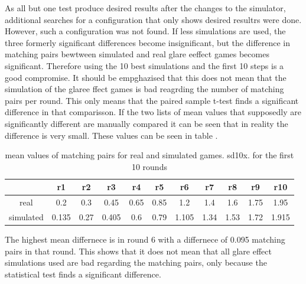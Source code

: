 As all but one test produce desired results after the changes to the simulator, additional searches for a configuration that only shows desired resultrs were done.
However, such a configuration was not found. If less simulations are used, the three formerly significant differences become insignificant, but the difference in matching pairs bewtween simulated and real glare eeffect games becomes significant. Therefore using the 10 best simulations and the first 10 steps is a good compromise. It should be empghazised that this does not mean that the simulation of the glaree ffect games is bad reagrding the number of matching pairs per round. This only means that the paired sample t-test finds a significant difference in that comparisson. If the two lists of mean values that supposedly are significantly different are manually compared it can be seen that in reality the difference is very small. These values can be seen in table .

\begin{table}[H]
	\centering
	\caption{mean values of matching pairs for real and simulated games. sd10x. for the first 10 rounds}%
	\label{tab:small_difference}
	\begin{tabular}{|c|c|c|c|c|c|c|c|c|c|c|}
		\hline
		& r1   &  r2  & r3 & r4   &  r5  & r6& r7   &  r8  & r9	&	r10\\
		\hline
		real&0.2 &0.3	&  0.45  &  0.65   &0.85 &  1.2   &    1.4 & 1.6 &  1.75 &1.95	\\
		\hline
		simulated&0.135 &0.27 &	0.405 &0.6  & 0.79 & 1.105& 1.34 & 1.53 & 1.72 & 1.915		\\
		\hline
	\end{tabular}
\end{table}

The highest mean differnece is in round 6 with a differnece of 0.095 matching pairs in that round. This shows that it does not mean that all glare effect simulations used are bad regarding the matching pairs, only because the statistical test finds a significant difference. 

